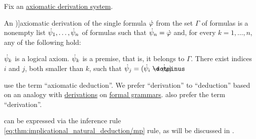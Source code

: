 \begin{definition}\label{def:axiomatic_derivation}
  Fix an \hyperref[def:axiomatic_derivation_system]{axiomatic derivation system}.

  An \term[ru=вывод (\cite[35]{Герасимов2011})]{axiomatic derivation} of the single formula \( \dot{\varphi} \) from the set \( \Gamma \) of formulas is a nonempty list \( \dot{\psi}_1, \ldots, \dot{\psi}_n \) of formulas such that \( \dot{\psi}_n = \dot{\varphi} \) and, for every \( k = 1, \ldots, n \), any of the following hold:
  \begin{thmenum}
     \( \dot{\psi}_k \) is a logical axiom.
     \( \dot{\psi}_k \) is a premise, that is, it belongs to \( \Gamma \).
     There exist indices \( i \) and \( j \), both smaller than \( k \), such that \( \syn\psi_j = (\syn\psi_i \synimplies \syn\psi_k) \).
  \end{thmenum}
\end{definition}
\begin{comments}
  \item {} use the term \enquote{axiomatic deduction}. We prefer \enquote{derivation} to \enquote{deduction} based on an analogy with \hyperref[def:formal_grammar/derivation]{derivations} on \hyperref[def:formal_grammar]{formal grammars}.  also prefer the term \enquote{derivation}.
  \item {} can be expressed via the inference rule \eqref{eq:thm:implicational_natural_deduction/mp} rule, as will be discussed in .
\end{comments}

